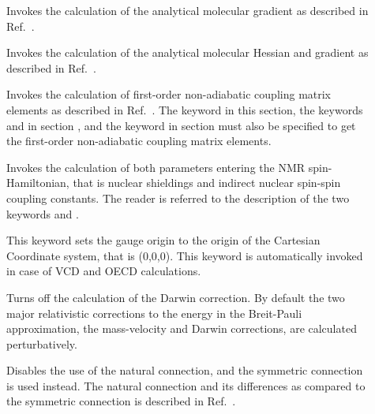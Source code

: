 \begin{description}
\item[] Invokes the calculation of the analytical
molecular gradient as described in Ref.~\cite{tuhjahjajpjjcp84}.

\item[] Invokes the calculation of the analytical
molecular Hessian and gradient as
described in Ref.~\cite{tuhjahjajpjjcp84}.

\item[] Invokes the calculation of first-order non-adiabatic
coupling matrix elements as
described in Ref.~\cite{klbpjhjajjothjcp97}.
The keyword  in this section,
the keywords  and  in section ,
and the keyword  in section 
must also be specified to get the first-order non-adiabatic coupling matrix elements.



\item[] Invokes the calculation of both parameters
entering the NMR spin-Hamiltonian, that is nuclear
shieldings and
indirect nuclear spin-spin coupling
constants. The reader is referred to the
description of the two keywords  and .

\item[] This keyword sets the gauge
origin  to the origin of the Cartesian Coordinate system,
that is (0,0,0). This keyword is automatically invoked in case of VCD
and OECD calculations.

\item[] Turns off the calculation of the Darwin
correction. By default the two major relativistic
corrections to the energy in the Breit-Pauli approximation, the
mass-velocity and Darwin
corrections, are calculated
perturbatively.

\item[] Disables the use of the natural
connection, and
the symmetric connection is used instead. The
natural connection and
its differences as compared to the symmetric connection is described
in Ref.~\cite{joklbkrthpjtca90,krthjopjklbcpl235}.


\end{description}
